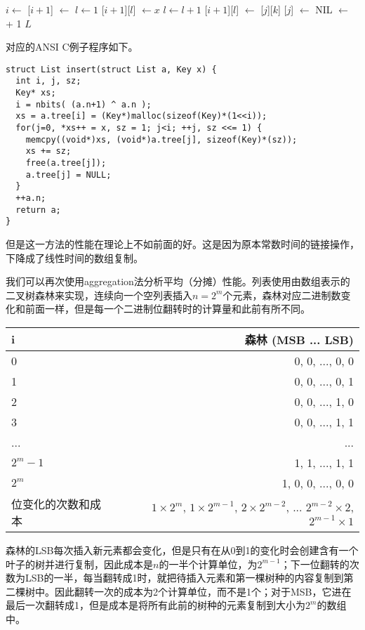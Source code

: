\documentclass[UTF8]{article}
\begin{document}
\begin{algorithmic}
  \State $i \gets $ 
  \State {}[$i+1$] $\gets $ 
  \State $l \gets 1$
  \State  {}[$i+1$][$l$]  $\gets x$
      \State $l \gets l + 1$
      \State {}[$i+1$][$l$]  $\gets$ [$j$][$k$]
    \EndFor
    \State {}[$j$] $\gets$ NIL
  \EndFor
  \State {} $\gets$  + 1
  \State \Return $L$
\EndFunction
\end{algorithmic}

对应的ANSI C例子程序如下。

\begin{lstlisting}
struct List insert(struct List a, Key x) {
  int i, j, sz;
  Key* xs;
  i = nbits( (a.n+1) ^ a.n );
  xs = a.tree[i] = (Key*)malloc(sizeof(Key)*(1<<i));
  for(j=0, *xs++ = x, sz = 1; j<i; ++j, sz <<= 1) {
    memcpy((void*)xs, (void*)a.tree[j], sizeof(Key)*(sz));
    xs += sz;
    free(a.tree[j]);
    a.tree[j] = NULL;
  }
  ++a.n;
  return a;
}
\end{lstlisting}

但是这一方法的性能在理论上不如前面的好。这是因为原本常数时间的链接操作，下降成了线性时间的数组复制。

我们可以再次使用aggregation法分析平均（分摊）性能。列表使用由数组表示的二叉树森林来实现，连续向一个空列表插入$n = 2^m$个元素，森林对应二进制数变化和前面一样，但是每一个二进制位翻转时的计算量和此前有所不同。

\begin{tabular}{l | r}
  \hline
  i & 森林 (MSB ... LSB) \\
  \hline
  0 & 0, 0, ..., 0, 0 \\
  1 & 0, 0, ..., 0, 1 \\
  2 & 0, 0, ..., 1, 0 \\
  3 & 0, 0, ..., 1, 1 \\
  ... & ... \\
  $2^m-1$ & 1, 1, ..., 1, 1 \\
  $2^m$ & 1, 0, 0, ..., 0, 0 \\
  \hline
  位变化的次数和成本 & $1 \times 2^m$, $1 \times 2^{m-1}$, $2 \times 2^{m-2}$, ... $2^{m-2} \times 2$, $2^{m-1} \times 1$ \\
  \hline
\end{tabular}

森林的LSB每次插入新元素都会变化，但是只有在从0到1的变化时会创建含有一个叶子的树并进行复制，因此成本是$n$的一半个计算单位，为$2^{m-1}$；下一位翻转的次数为LSB的一半，每当翻转成1时，就把待插入元素和第一棵树种的内容复制到第二棵树中。因此翻转一次的成本为2个计算单位，而不是1个；对于MSB，它进在最后一次翻转成1，但是成本是将所有此前的树种的元素复制到大小为$2^m$的数组中。
\end{document}
